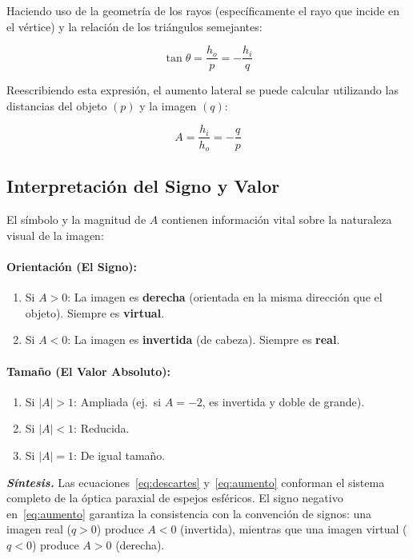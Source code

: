 \documentclass[12pt, a4paper]{article}
\theoremstyle{definition}
\begin{document}
Haciendo uso de la geometría de los rayos (específicamente el rayo que incide en el vértice) y la relación de los triángulos semejantes:

\begin{equation}
  \tan\theta = \frac{h_o}{p} = -\frac{h_i}{q}
  \label{eq:triangulos}
\end{equation}

Reescribiendo esta expresión, el aumento lateral se puede calcular utilizando las distancias del objeto \((p)\) y la imagen \((q)\):

\begin{equation}
  A = \frac{h_i}{h_o} = -\frac{q}{p}
  \label{eq:aumento}
\end{equation}

\subsection{Interpretación del Signo y Valor}

El símbolo y la magnitud de \(A\) contienen información vital sobre la naturaleza visual de la imagen:

\paragraph{Orientación (El Signo):}
\begin{enumerate}
  \item Si \(A > 0\): La imagen es \textbf{derecha} (orientada en la misma dirección que el objeto). Siempre es \textbf{virtual}.
  \item Si \(A < 0\): La imagen es \textbf{invertida} (de cabeza). Siempre es \textbf{real}.
\end{enumerate}

\paragraph{Tamaño (El Valor Absoluto):}
\begin{enumerate}
  \item Si \(|A| > 1\): Ampliada (ej.\ si \(A = -2\), es invertida y doble de grande).
  \item Si \(|A| < 1\): Reducida.
  \item Si \(|A| = 1\): De igual tamaño.
\end{enumerate}

\textit{\textbf{Síntesis.}} Las ecuaciones~\eqref{eq:descartes} y~\eqref{eq:aumento} conforman el sistema completo de la óptica paraxial de espejos esféricos. El signo negativo en~\eqref{eq:aumento} garantiza la consistencia con la convención de signos: una imagen real (\(q > 0\)) produce \(A < 0\) (invertida), mientras que una imagen virtual (\(q < 0\)) produce \(A > 0\) (derecha).
\end{document}
